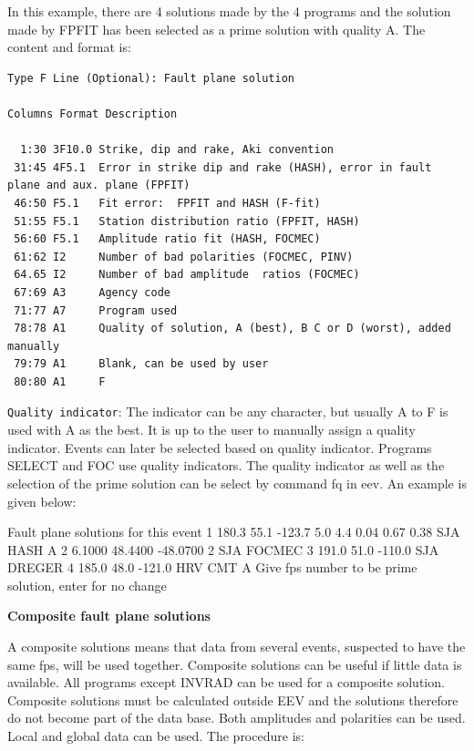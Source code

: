 In this example, there are 4 solutions made by the 4 programs and the solution made by FPFIT has been selected as a prime solution with quality A. The content and format is: 

\begin{verbatim}
Type F Line (Optional): Fault plane solution 

Columns Format Description

  1:30 3F10.0 Strike, dip and rake, Aki convention
 31:45 4F5.1  Error in strike dip and rake (HASH), error in fault plane and aux. plane (FPFIT) 
 46:50 F5.1   Fit error:  FPFIT and HASH (F-fit)
 51:55 F5.1   Station distribution ratio (FPFIT, HASH)
 56:60 F5.1   Amplitude ratio fit (HASH, FOCMEC)
 61:62 I2     Number of bad polarities (FOCMEC, PINV) 
 64.65 I2     Number of bad amplitude  ratios (FOCMEC)
 67:69 A3     Agency code
 71:77 A7     Program used
 78:78 A1     Quality of solution, A (best), B C or D (worst), added manually
 79:79 A1     Blank, can be used by user
 80:80 A1     F
\end{verbatim}


\verb|Quality indicator|: The indicator can be any character, but usually A to F is used with A as the best. It is up to the user to manually assign a quality indicator. Events can later be selected based on quality indicator. Programs SELECT and FOC use quality indicators. The quality indicator as well as the selection of the prime solution can be select by command fq in eev. An example is given below:


  Fault plane solutions for this event
 1  180.3      55.1    -123.7  5.0  4.4      0.04 0.67 0.38      SJA HASH   A
 2 6.1000   48.4400  -48.0700                               2    SJA FOCMEC
 3  191.0      51.0    -110.0                                    SJA DREGER
 4  185.0      48.0    -121.0                                    HRV CMT    A
  Give fps number to be prime solution, enter for no change




\textbf{Composite fault plane solutions}

A composite solutions means that data from several events, suspected to have the same fps, will be used together. Composite solutions can be useful if little data is available. All programs except INVRAD can be used for a composite solution. Composite solutions must be calculated outside EEV and the solutions therefore do not become part of the data base. Both amplitudes and polarities can be used. Local and global data can be used. The procedure is:


